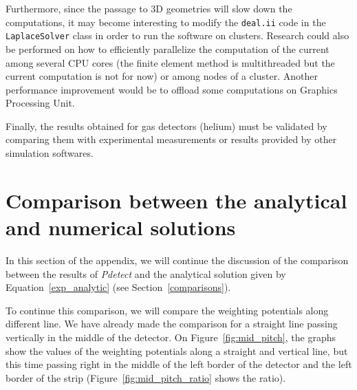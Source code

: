 \documentclass[11pt]{article}
\begin{document}
		Furthermore, since the passage to 3D geometries will slow down the computations,
		it may become interesting to modify the \texttt{deal.ii} code in the
		\texttt{LaplaceSolver} class in order to run the software on clusters.
		Research could also be performed on how to efficiently parallelize the
		computation of the current among several CPU cores (the finite element method
		is multithreaded but the current computation is not for now) or among nodes of a cluster.
		Another performance improvement would be to offload some computations on
		Graphics Processing Unit.

		Finally, the results obtained for gas detectors (helium) must be validated
		by comparing them with experimental measurements or results provided by other
		simulation softwares.


\newpage

\appendix

\section{Comparison between the analytical and numerical solutions} \label{App:comp_an}

	In this section of the appendix, we will continue the discussion of the comparison
	between the results of \textit{Pdetect} and the analytical solution given by
	Equation~\ref{exp_analytic} (see Section~\ref{comparisons}).

	To continue this comparison, we will compare the weighting potentials along different line.
	We have already made the comparison for a straight line passing vertically in the middle of the
	detector. On Figure~\ref{fig:mid_pitch}, the graphs show the values of the weighting potentials along a
	straight and vertical line, but this time passing right in the middle of the left border of
	the detector and the left border of the strip (Figure~\ref{fig:mid_pitch_ratio} shows the ratio).
\end{document}
